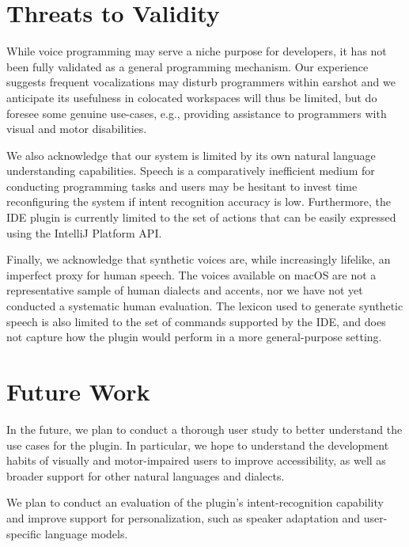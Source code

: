 \documentclass[conference]{IEEEtran}
\begin{document}

\section{Threats to Validity}

While voice programming may serve a niche purpose for developers, it has not been fully validated as a general programming mechanism. Our experience suggests frequent vocalizations may disturb programmers within earshot and we anticipate its usefulness in colocated workspaces will thus be limited, but do foresee some genuine use-cases, e.g., providing assistance to programmers with visual and motor disabilities.

We also acknowledge that our system is limited by its own natural language understanding capabilities. Speech is a comparatively inefficient medium for conducting programming tasks and users may be hesitant to invest time reconfiguring the system if intent recognition accuracy is low. Furthermore, the IDE plugin is currently limited to the set of actions that can be easily expressed using the IntelliJ Platform API.

Finally, we acknowledge that synthetic voices are, while increasingly lifelike, an imperfect proxy for human speech. The voices available on macOS are not a representative sample of human dialects and accents, nor we have not yet conducted a systematic human evaluation. The lexicon used to generate synthetic speech is also limited to the set of commands supported by the IDE, and does not capture how the plugin would perform in a more general-purpose setting.

\section{Future Work}

In the future, we plan to conduct a thorough user study to better understand the use cases for the plugin. In particular, we hope to understand the development habits of visually and motor-impaired users to improve accessibility, as well as broader support for other natural languages and dialects.

We plan to conduct an evaluation of the plugin's intent-recognition capability and improve support for personalization, such as speaker adaptation and user-specific language models.
\end{document}
